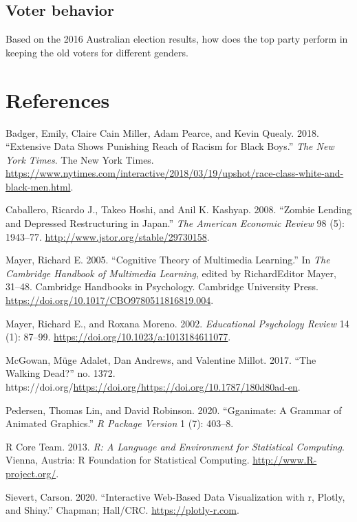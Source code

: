 \hypertarget{voter-behavior}{%
\subsection{Voter behavior}\label{voter-behavior}}

Based on the 2016 Australian election results, how does the top party perform in keeping the old voters for different genders.

\hypertarget{references}{%
\section*{References}\label{references}}

\hypertarget{refs}{}
\begin{CSLReferences}{1}{0}
\leavevmode{}%
Badger, Emily, Claire Cain Miller, Adam Pearce, and Kevin Quealy. 2018. {``Extensive Data Shows Punishing Reach of Racism for Black Boys.''} \emph{The New York Times}. The New York Times. \url{https://www.nytimes.com/interactive/2018/03/19/upshot/race-class-white-and-black-men.html}.

\leavevmode{}%
Caballero, Ricardo J., Takeo Hoshi, and Anil K. Kashyap. 2008. {``Zombie Lending and Depressed Restructuring in Japan.''} \emph{The American Economic Review} 98 (5): 1943--77. \url{http://www.jstor.org/stable/29730158}.

\leavevmode{}%
Mayer, Richard E. 2005. {``Cognitive Theory of Multimedia Learning.''} In \emph{The Cambridge Handbook of Multimedia Learning}, edited by RichardEditor Mayer, 31--48. Cambridge Handbooks in Psychology. Cambridge University Press. \url{https://doi.org/10.1017/CBO9780511816819.004}.

\leavevmode{}%
Mayer, Richard E., and Roxana Moreno. 2002. \emph{Educational Psychology Review} 14 (1): 87--99. \url{https://doi.org/10.1023/a:1013184611077}.

\leavevmode{}%
McGowan, Müge Adalet, Dan Andrews, and Valentine Millot. 2017. {``The Walking Dead?''} no. 1372. https://doi.org/\url{https://doi.org/https://doi.org/10.1787/180d80ad-en}.

\leavevmode{}%
Pedersen, Thomas Lin, and David Robinson. 2020. {``Gganimate: A Grammar of Animated Graphics.''} \emph{R Package Version} 1 (7): 403--8.

\leavevmode{}%
R Core Team. 2013. \emph{R: A Language and Environment for Statistical Computing}. Vienna, Austria: R Foundation for Statistical Computing. \url{http://www.R-project.org/}.

\leavevmode{}%
Sievert, Carson. 2020. {``Interactive {Web-Based} Data Visualization with r, Plotly, and Shiny.''} Chapman; Hall/CRC. \url{https://plotly-r.com}.

\end{CSLReferences}

